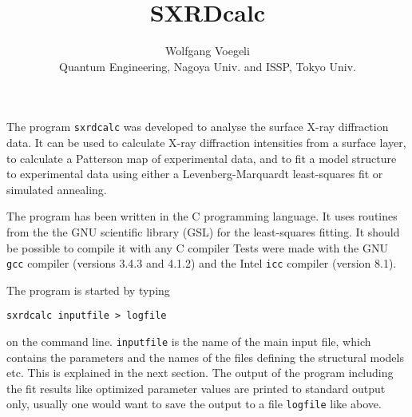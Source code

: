\documentclass[a4paper]{article}
\begin{document}
\newenvironment{vardef}{%
  \renewcommand{\descriptionlabel}[1]%
   {\hspace{\labelsep}\makebox[10em][l]{\texttt{##1}} --}
          \begin{description}%
          \setlength{\itemsep}{0pt}%
        \setlength{\itemindent}{0em}
}{\end{description}}

\newenvironment{filestruc}{%
\ttfamily %
\setlength{\leftmargin}{1.2\leftmargin}%
\begin{flushleft}%
}%
{\end{flushleft}}

\newcommand{\fvar}[1]{\texttt{\em #1}}
\newcommand{\fkey}[1]{\texttt{#1}}


\title{SXRDcalc}
\author{Wolfgang Voegeli \\
Quantum Engineering, Nagoya Univ. and ISSP, Tokyo Univ.}
\maketitle{}

\renewcommand{\descriptionlabel}[1]%
         {\hspace{\labelsep}\textsf{#1}}

The program \texttt{sxrdcalc} was developed to analyse the surface X-ray
diffraction data. It can be used to calculate X-ray diffraction
intensities from a surface layer, to calculate a Patterson map of
experimental data, and to fit a model structure to experimental data
using either a Levenberg-Marquardt least-squares fit or  simulated
annealing.

The program has been written in the C programming language. It uses
routines from the the GNU scientific library (GSL) for the
least-squares fitting. It should be possible to compile it with any C
compiler Tests were made with the GNU \texttt{gcc} compiler (versions 3.4.3
and 4.1.2) and the Intel \texttt{icc} compiler (version 8.1).

The program is started by typing
\begin{verbatim}
sxrdcalc inputfile > logfile
\end{verbatim}
on the command line. \texttt{inputfile} is the name of the main
input file, which contains the parameters and the names of the files
defining the structural models etc. This is explained in the next
section.
The output of the program including the fit results like optimized
parameter values are printed to standard output only, usually one
would want to save the output to a file \texttt{logfile} like above.
\end{document}
